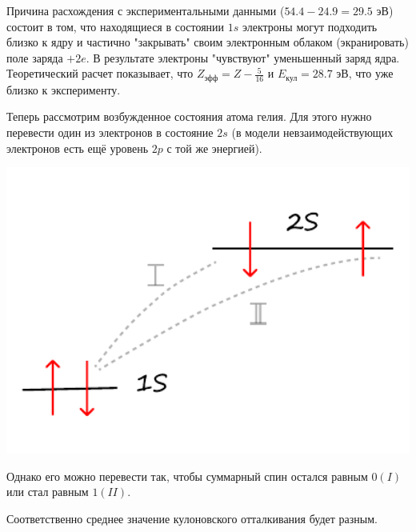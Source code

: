 Причина расхождения с экспериментальными данными ($54.4 - 24.9 = 29.5$ эВ) состоит в том, что находящиеся в состоянии $1s$ электроны могут подходить близко к ядру и частично "закрывать" своим электронным облаком (экранировать) поле заряда $+2e$.
В результате электроны "чувствуют" уменьшенный заряд ядра. 
Теоретический расчет показывает, что $Z_\text{эфф} = Z - \frac{5}{16}$ и $E_\text{кул} = 28.7$ эВ, что уже близко к эксперименту.

Теперь рассмотрим возбужденное состояния атома гелия. Для этого нужно перевести один из электронов в состояние $2s$ (в модели невзаимодействующих электронов есть ещё уровень $2p$ с той же энергией).

\begin{minipage}{0.33\textwidth}
    \includegraphics[width=1\textwidth]{image/1sto2s.pdf}
\end{minipage}
\hfill
\begin{minipage}{0.6\textwidth}
    Однако его можно перевести так, чтобы суммарный спин остался равным $0(I)$ или стал равным $1(II)$.

	Соответственно среднее значение кулоновского отталкивания будет разным.
\end{minipage}

